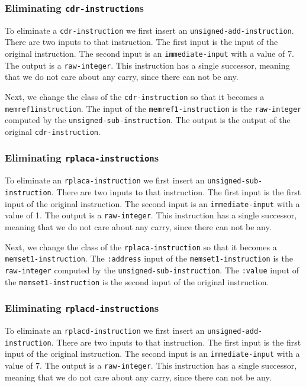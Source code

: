 \subsubsection{Eliminating \texttt{cdr-instruction}s}

To eliminate a \texttt{cdr-instruction} we first insert an
\texttt{unsigned-add-instruction}.  There are two inputs to that
instruction.  The first input is the input of the original
instruction.  The second input is an \texttt{immediate-input} with a
value of 7.  The output is a \texttt{raw-integer}.  This instruction
has a single successor, meaning that we do not care about any carry,
since there can not be any.

Next, we change the class of the \texttt{cdr-instruction} so that it
becomes a \texttt{memref1\-instruction}.  The input of the
\texttt{memref1-instruction} is the \texttt{raw-integer} computed by
the \texttt{unsigned-sub-instruction}.  The output is the output of
the original \texttt{cdr-instruction}.

\subsubsection{Eliminating \texttt{rplaca-instruction}s}

To eliminate an \texttt{rplaca-instruction} we first insert an
\texttt{unsigned-sub-instruction}.  There are two inputs to that
instruction.  The first input is the first input of the original
instruction.  The second input is an \texttt{immediate-input} with a
value of 1.  The output is a \texttt{raw-integer}.  This instruction
has a single successor, meaning that we do not care about any carry,
since there can not be any.

Next, we change the class of the \texttt{rplaca-instruction} so that
it becomes a \texttt{memset1-instruction}.  The \texttt{:address}
input of the \texttt{memset1-instruction} is the \texttt{raw-integer}
computed by the \texttt{unsigned-sub-instruction}.  The
\texttt{:value} input of the \texttt{memset1-instruction} is the
second input of the original instruction.

\subsubsection{Eliminating \texttt{rplacd-instruction}s}

To eliminate an \texttt{rplacd-instruction} we first insert an
\texttt{unsigned-add-instruction}.  There are two inputs to that
instruction.  The first input is the first input of the original
instruction.  The second input is an \texttt{immediate-input} with a
value of 7.  The output is a \texttt{raw-integer}.  This instruction
has a single successor, meaning that we do not care about any carry,
since there can not be any.

